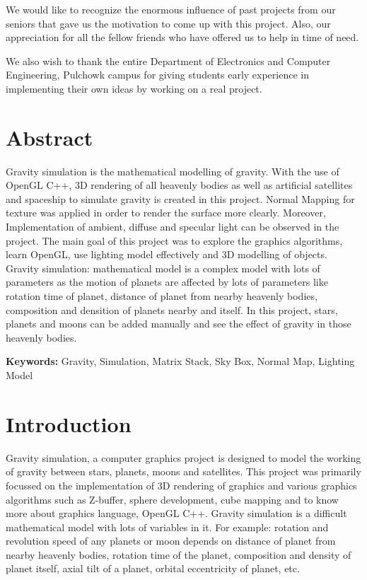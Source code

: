 \documentclass[12pt]{article}
\begin{document}
We would like to recognize the enormous influence of past projects from our seniors that gave us
the motivation to come up with this project. Also, our appreciation for all the fellow friends who
have offered us to help in time of need.

We also wish to thank the entire Department of Electronics and Computer Engineering, 
Pulchowk campus for giving students early experience in implementing their own ideas by
working on a real project.

\clearpage

\tableofcontents
\clearpage

\section{Abstract}
Gravity simulation is the mathematical modelling of gravity. With the use of OpenGL C++, 3D rendering of all heavenly bodies as well as artificial satellites and spaceship to simulate gravity is created in this project. Normal Mapping for texture was applied in order to render the surface more clearly. Moreover, Implementation of ambient, diffuse and specular light can be observed in the project. The main goal of this project was to explore the graphics algorithms, learn OpenGL, use lighting model effectively and 3D modelling of objects. Gravity simulation: mathematical model is a complex model with lots of parameters as the motion of planets are affected by lots of parameters like rotation time of planet, distance of planet from nearby heavenly bodies, composition and densition of planets nearby and itself. In this project, stars, planets and moons can be added manually and see the effect of gravity in those heavenly bodies.

\textbf{Keywords:} Gravity, Simulation, Matrix Stack, Sky Box, Normal Map, Lighting Model 

\section{Introduction}
Gravity simulation, a computer graphics project is designed to model the working of gravity between stars, planets, moons and satellites. This project was primarily focussed on the implementation of 3D rendering of graphics and various graphics algorithms such as Z-buffer, sphere development, cube mapping and to know more about graphics language, OpenGL C++. Gravity simulation is a difficult mathematical model with lots of variables in it. For example: rotation and revolution speed of any planets or moon depends on distance of planet from nearby heavenly bodies, rotation time of the planet, composition and density of planet itself, axial tilt of a planet, orbital eccentricity of planet, etc. 
\end{document}
